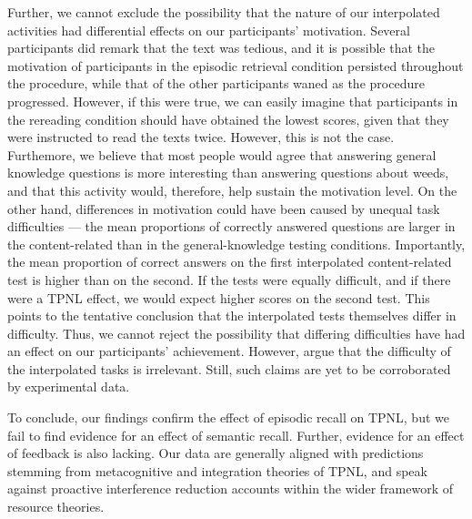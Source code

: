 \documentclass[../main.tex]{subfiles}
\begin{document}
Further, we cannot exclude the possibility that the nature of our interpolated
activities had differential effects on our participants' motivation.
Several participants did remark that the text was tedious, and it is possible 
that the motivation of participants in the episodic retrieval condition 
persisted throughout the procedure, while that of the other participants waned 
as the procedure progressed. However, if this were true, we can easily imagine 
that participants in the rereading condition should have obtained the lowest 
scores, given that they were instructed to read the texts twice. However, this 
is not the case. Furthemore, we believe that most people would agree that 
answering general knowledge questions is more interesting than answering 
questions about weeds, and that this activity would, therefore, help 
sustain the motivation level. On the other hand, differences in 
motivation could have been caused by unequal task difficulties --- the mean 
proportions of correctly answered questions are larger in the content-related 
than in the general-knowledge testing conditions. Importantly,
the mean proportion of correct answers on the first interpolated 
content-related test is higher than on the second. If the tests were equally 
difficult, and if there were a TPNL effect, we would expect higher scores on 
the second test. This points to the tentative conclusion that the interpolated 
tests themselves differ in difficulty. Thus, we cannot reject the possibility 
that differing difficulties have had an effect on our participants' 
achievement. However, \citet{divisRetrievalSpeedsContext2014} argue that the 
difficulty of the interpolated tasks is irrelevant. Still, such claims are yet 
to be corroborated by experimental data.

To conclude, our findings confirm the effect of episodic recall on TPNL, but we
fail to find evidence for an effect of semantic recall. Further, evidence for an
effect of feedback is also lacking. Our data are generally aligned with
predictions stemming from metacognitive and integration theories of TPNL, and
speak against proactive interference reduction accounts within the wider
framework of resource theories.
\end{document}
